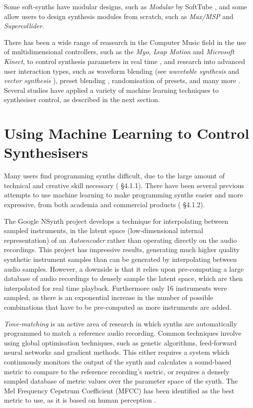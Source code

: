 \documentclass[11pt, oneside]{report}   	%
\begin{document}
Some soft-synths have modular designs, such as \emph{Modular} by SoftTube \cite{SoftTube},
and some allow users to design synthesis modules from scratch, such as \emph{Max/MSP} and \emph{Supercollider}.

There has been a wide range of reasearch in the Computer Music field in the use of multidimensional controllers, such as the  \emph{Myo}, \emph{Leap Motion} and \emph{Microsoft Kinect}, to control synthesis parameters in real time \cite{ICMC, TubbThesis}, and research into advanced user interaction types, such as waveform blending (see \emph{wavetable synthesis} \cite{Wavetable} and \emph{vector synthesis} \cite{SY22}), preset blending \cite{Interpolation}, randomisation of presets, and many more \cite{YeeKing, EvolvedAudioEffects}.  Several studies have applied a variety of machine learning techniques to synthesiser control, as described in the next section.

\section{Using Machine Learning to Control Synthesisers}\label{sec:MachineLearning}
Many users find programming synths difficult, due to the large amount of technical and creative skill necessary (\cite{YeeKing} \S 4.1.1). There have been several previous attempts to use machine learning to make programming synths easier and more expressive, from both academia and commercial products (\cite{YeeKing} \S 4.1.2).

The Google NSynth project \cite{NSynth} develops a technique for interpolating between sampled instruments, in the latent space (low-dimensional internal representation) of an \emph{Autoencoder} rather than operating directly on the audio recordings. This project has impressive results, generating much higher quality synthetic instrument samples than can be generated by interpolating between audio samples. However, a downside is that it relies upon pre-computing a large database of audio recordings to densely sample the latent space, which are then interpolated for real time playback. Furthermore only 16 instruments were sampled, as there is an exponential increase in the number of possible combinations that have to be pre-computed as more instruments are added.

\emph{Tone-matching} is an active area of research in which synths are automatically programmed to match a reference audio recording. Common techniques involve using global optimisation techniques, such as genetic algorithms, feed-forward neural networks and gradient methods. This either requires a system which continuously monitors the output of the synth and calculates a sound-based metric to compare to the reference recording's metric, or requires a densely sampled database of metric values over the parameter space of the synth.  The Mel Frequency Cepstrum Coefficient (MFCC) has been identified as the best metric to use, as it is based on human perception \cite{YeeKing}.
\end{document}
